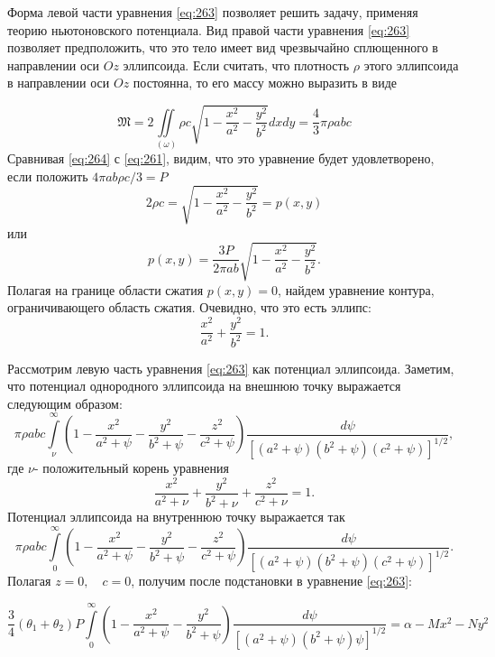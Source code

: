 \documentclass[specialist, subf, href, colorlinks=true, 14pt, final]{disser}
\theoremstyle{definition}
\begin{document}
Форма левой части уравнения \eqref{eq:263} позволяет решить задачу, применяя теорию ньютоновского потенциала. Вид правой части уравнения \eqref{eq:263} позволяет предположить, что это тело имеет вид чрезвычайно сплющенного в направлении оси $Oz$ эллипсоида. Если считать, что плотность $\rho$ этого эллипсоида в направлении оси $Oz$ постоянна, то его массу можно выразить в виде
\addtocounter{equation}{1}
\begin{equation}\label{eq:264}
   \mathfrak{M} = 2 \iint\limits_{(\omega)} \rho c \sqrt{1 - \frac{x^2}{a^2} - \frac{y^2}{b^2}} dx dy = \frac{4}{3} \pi \rho a b c 
  \tag{4}
\end{equation}
Сравнивая \eqref{eq:264} с \eqref{eq:261}, видим, что это уравнение будет удовлетворено, если положить $4\pi ab\rho c / 3 = P$
\[ 
2 \rho c = \sqrt{1 - \frac{x^2}{a^2} - \frac{y^2}{b^2}} = p(x,y) 
\]
или
\[ p(x,y) = \frac{3P}{2 \pi a b} \sqrt{1 - \frac{x^2}{a^2} - \frac{y^2}{b^2}} . \]
Полагая на границе области сжатия $p(x,y) = 0$, найдем уравнение контура, ограничивающего область сжатия. Очевидно, что это есть эллипс:
\[ \frac{x^2}{a^2} + \frac{y^2}{b^2} = 1 .\]

Рассмотрим левую часть уравнения \eqref{eq:263} как потенциал эллипсоида. Заметим, что потенциал однородного эллипсоида на внешнюю точку выражается следующим образом:
\[ \pi \rho a b c \int \limits_{\nu}^{\infty} \left( 1 - \frac{x^2}{a^2 + \psi} - \frac{y^2}{b^2 + \psi} - \frac{z^2}{c^2 + \psi}  \right) \frac{d \psi}{\left[(a^2 + \psi)(b^2 + \psi)(c^2 + \psi)\right]^{1/2}} , \]
где $\nu $- положительный корень уравнения
\[ \frac{x^2}{a^2 + \nu} + \frac{y^2}{b^2 + \nu} + \frac{z^2}{c^2 + \nu} = 1.\]
Потенциал эллипсоида на внутреннюю точку выражается так
\[ \pi \rho a b c \int \limits_{0}^{\infty} \left( 1 - \frac{x^2}{a^2 + \psi} - \frac{y^2}{b^2 + \psi} - \frac{z^2}{c^2 + \psi}  \right) \frac{d \psi}{\left[(a^2 + \psi)(b^2 + \psi)(c^2 + \psi)\right]^{1/2}}. \]
Полагая $z = 0, \quad c = 0$, получим после подстановки в уравнение \eqref{eq:263}:
\addtocounter{equation}{1}
\begin{equation}\label{eq:265}
   \frac{3}{4}(\theta_1 + \theta_2)P \int \limits_0^{\infty} \left( 1 - \frac{x^2}{a^2 + \psi} - \frac{y^2}{b^2 + \psi} \right) \frac{d \psi}{\left[(a^2 + \psi)(b^2 + \psi)\psi\right]^{1/2}} = \alpha - Mx^2 - N y^2 
    \tag{5}
\end{equation}
  
\end{document}
